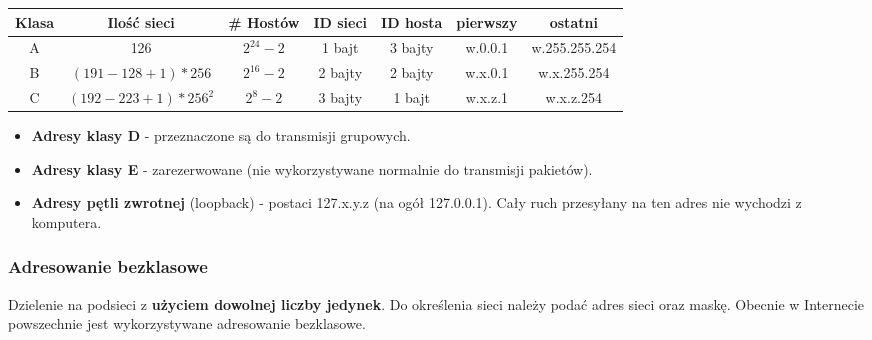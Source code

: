 \documentclass[12pt]{article}
\begin{document}
    \begin{table}[H]
        \begin{center}
            \begin{tabular}{|c|c|c|c|c|c|c|}
                \hline
                Klasa & Ilość sieci & \# Hostów & ID sieci & ID hosta & pierwszy & ostatni\\
                \hline
                A & 126 & $2^{24}-2$ & 1 bajt & 3 bajty & w.0.0.1 & w.255.255.254\\
                \hline
                B & $(191-128+1)*256$ & $2^{16}-2$ & 2 bajty & 2 bajty & w.x.0.1 & w.x.255.254\\
                \hline
                C & $(192-223+1)*256^2$ & $2^8-2$ & 3 bajty & 1 bajt & w.x.z.1 & w.x.z.254\\
                \hline
            \end{tabular}
        \end{center}
    \end{table}


    \begin{itemize}
        \item \textbf{Adresy klasy D} - przeznaczone są do transmisji grupowych.
        \item \textbf{Adresy klasy E} - zarezerwowane (nie wykorzystywane normalnie do transmisji pakietów).
        \item \textbf{Adresy pętli zwrotnej} (loopback) - postaci 127.x.y.z (na ogół 127.0.0.1). Cały ruch przesyłany na ten adres nie wychodzi z komputera.
    \end{itemize}


    \subsubsection{Adresowanie bezklasowe}
    Dzielenie na podsieci z \textbf{użyciem dowolnej liczby jedynek}. Do określenia sieci należy podać adres
    sieci oraz maskę. Obecnie w Internecie powszechnie jest wykorzystywane adresowanie
    bezklasowe.
\end{document}
